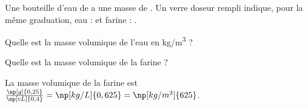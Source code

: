 





\hauteurLargeurCadreReponse		{8mm}{2cm}
\initialisationEntrainement

Une bouteille d’eau de  a une masse de . Un verre doseur rempli indique, pour la même graduation,
eau :  et 
farine : .
\debutEntrainement


\begin{enonce}
Quelle est la masse volumique de l’eau en \si{kg/m^3} ?
\end{enonce}





\begin{enonce}
Quelle est la masse volumique de la farine ?
\end{enonce}



\begin{corrigeNewpage}
La masse volumique de la farine est $\frac{\np[g]{0,25}}{\np[cL]{0,4}}= \np[kg/L]{0,625} = \np[kg/m^3]{625} $.
\end{corrigeNewpage}

